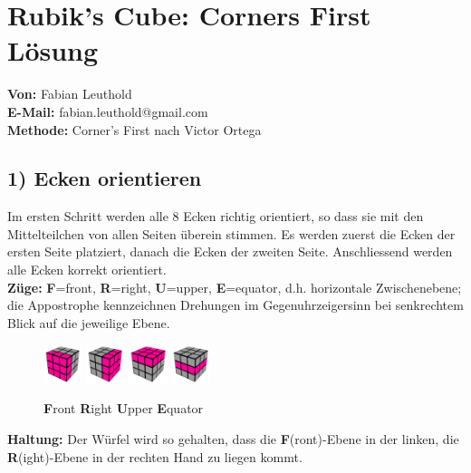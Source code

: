 \documentclass[letterpaper,10pt,twoside,twocolumn,openany]{book}
\begin{document}

\chapter{Rubik's Cube: Corners First Lösung}
{\footnotesize\noindent \textbf{Von:} Fabian Leuthold\\\noindent \textbf{E-Mail:} fabian.leuthold@gmail.com\\\noindent \textbf{Methode:} Corner's First nach Victor Ortega}
\section{1) Ecken orientieren}
\begin{justify}
Im ersten Schritt werden alle 8 Ecken richtig orientiert, so dass sie mit den Mittelteilchen von allen Seiten überein stimmen. Es werden zuerst die Ecken der ersten Seite platziert, danach die Ecken der zweiten Seite. Anschliessend werden alle Ecken korrekt orientiert.\\

\noindent \textbf{Züge:} \textbf{F}=front, \textbf{R}=right, \textbf{U}=upper, \textbf{E}=equator, d.h. horizontale Zwischenebene; die Appostrophe kennzeichnen Drehungen im Gegenuhrzeigersinn bei senkrechtem Blick auf die jeweilige Ebene.

\begin{figure}[!htb] 
    \centering
    \includegraphics[width=0.1\textwidth]{img/draw_f.png}
    \includegraphics[width=0.1\textwidth]{img/draw_r.png}
    \includegraphics[width=0.1\textwidth]{img/draw_u.png}
    \includegraphics[width=0.1\textwidth]{img/draw_e.png}
    \caption*{\textbf{F}ront \kern 20pt \textbf{R}ight \kern 20pt \textbf{U}pper \kern 16pt  \textbf{E}quator}
\end{figure}

\noindent \textbf{Haltung:} Der Würfel wird so gehalten, dass die \textbf{F}(ront)-Ebene in der linken, die \textbf{R}(ight)-Ebene in der rechten Hand zu liegen kommt.
\end{justify}
\vspace{2mm}
\end{document}
